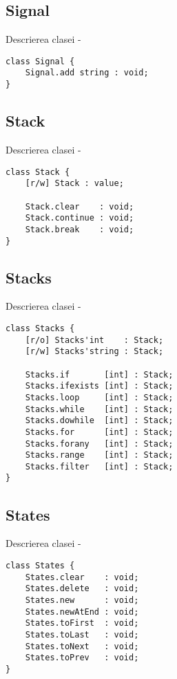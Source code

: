 \subsection{{\color{orange} Signal}}

\noindent Descrierea clasei  -
\begin{lstlisting}[numbers=none]
class Signal {
	Signal.add string : void;
}
\end{lstlisting}

\subsection{{\color{orange} Stack}}

\noindent Descrierea clasei  -
\begin{lstlisting}[numbers=none]
class Stack {
	[r/w] Stack : value;
	
	Stack.clear    : void;
	Stack.continue : void;
	Stack.break    : void;
}
\end{lstlisting}

\subsection{{\color{orange} Stacks}}

\noindent Descrierea clasei  -
\begin{lstlisting}[numbers=none]
class Stacks {
	[r/o] Stacks'int    : Stack;
	[r/w] Stacks'string : Stack;
	
	Stacks.if       [int] : Stack;
	Stacks.ifexists [int] : Stack;
	Stacks.loop     [int] : Stack;
	Stacks.while    [int] : Stack;
	Stacks.dowhile  [int] : Stack;
	Stacks.for      [int] : Stack;
	Stacks.forany   [int] : Stack;
	Stacks.range    [int] : Stack;
	Stacks.filter   [int] : Stack;
}
\end{lstlisting}

\subsection{{\color{orange} States}}

\noindent Descrierea clasei  -
\begin{lstlisting}[numbers=none]
class States {
	States.clear    : void;
	States.delete   : void;
	States.new      : void;
	States.newAtEnd : void;
	States.toFirst  : void;
	States.toLast   : void;
	States.toNext   : void;
	States.toPrev   : void;
}
\end{lstlisting}

